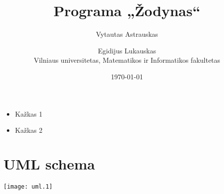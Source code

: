 \documentclass{report}
\title{%
Programa „Žodynas“}
\author{%
Vytautas Astrauskas \and Egidijus Lukauskas\\
Vilniaus universitetas, Matematikos ir Informatikos fakultetas
}
\date{\today}
\begin{document}
\maketitle
\bigskip

\begin{itemize}
  \item Kažkas 1
  \item Kažkas 2
\end{itemize}

\section{UML schema}
\texttt{[image: uml.1]}
\end{document}
